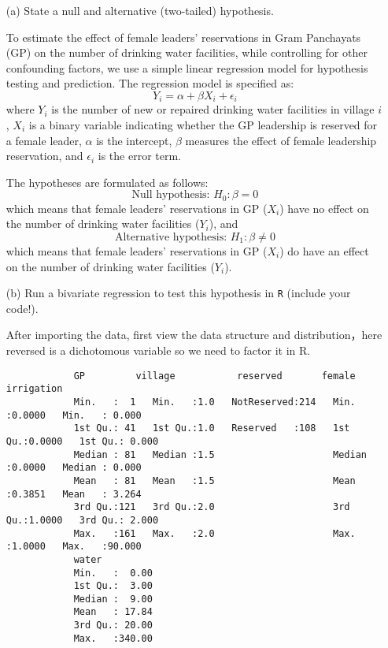 \documentclass[12pt,letterpaper]{article}
\begin{document}
	\begin{enumerate}
		\item [(a)] State a null and alternative (two-tailed) hypothesis.
		
		To estimate the effect of female leaders' reservations in Gram Panchayats (GP) on the number of drinking water facilities, while controlling for other confounding factors, we use a simple linear regression model for hypothesis testing and prediction. The regression model is specified as:
		\[
		Y_i = \alpha + \beta X_i + \epsilon_i
		\]
		where $Y_i$  is the number of new or repaired drinking water facilities in village $i$, $X_i$ is a binary variable indicating whether the GP leadership is reserved for a female leader, $\alpha$ is the intercept, $\beta$ measures the effect of female leadership reservation, and $\epsilon_i$ is the error term.
		
		The hypotheses are formulated as follows:
		\[
		\text{Null hypothesis: } H_0: \beta = 0
		\]
		which means that female leaders' reservations in GP ($X_i$) have no effect on the number of drinking water facilities ($Y_i$), and
		\[
		\text{Alternative hypothesis: } H_1: \beta \neq 0
		\]
		which means that female leaders' reservations in GP ($X_i$) do have an effect on the number of drinking water facilities ($Y_i$).
		
		\item [(b)] Run a bivariate regression to test this hypothesis in \texttt{R} (include your code!).
		
		After importing the data, first view the data structure and distribution，here reversed is a dichotomous variable so we need to factor it in R. \\
		
		\begin{verbatim}
			GP         village           reserved       female         irrigation    
			Min.   :  1   Min.   :1.0   NotReserved:214   Min.   :0.0000   Min.   : 0.000  
			1st Qu.: 41   1st Qu.:1.0   Reserved   :108   1st Qu.:0.0000   1st Qu.: 0.000  
			Median : 81   Median :1.5                     Median :0.0000   Median : 0.000  
			Mean   : 81   Mean   :1.5                     Mean   :0.3851   Mean   : 3.264  
			3rd Qu.:121   3rd Qu.:2.0                     3rd Qu.:1.0000   3rd Qu.: 2.000  
			Max.   :161   Max.   :2.0                     Max.   :1.0000   Max.   :90.000  
			water       
			Min.   :  0.00  
			1st Qu.:  3.00  
			Median :  9.00  
			Mean   : 17.84  
			3rd Qu.: 20.00  
			Max.   :340.00  
		\end{verbatim}
		

\end{enumerate}
\end{document}
